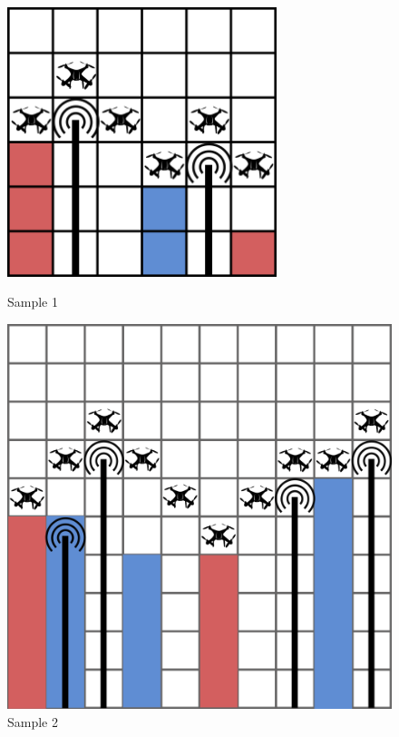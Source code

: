 \begin{figure}
  \centering
  \begin{minipage}{.3\textwidth}
    \centering
    \includegraphics[width=0.7\textwidth]{sample1.png}
    \caption{Sample 1}
    \label{fig:test1}
  \end{minipage}%
  \begin{minipage}{.3\textwidth}
    \centering
    \includegraphics[width=1\textwidth]{sample2.png}
    \caption{Sample 2}
    \label{fig:test2}
  \end{minipage}

\end{figure}
